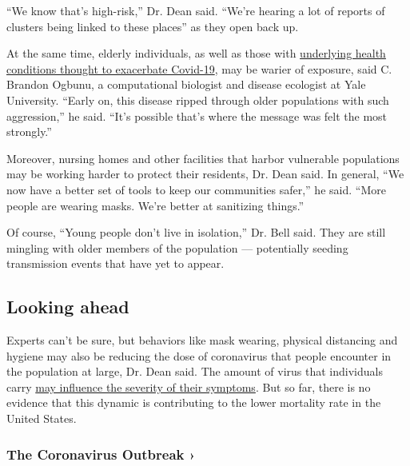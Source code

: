 ``We know that's high-risk,'' Dr. Dean said. ``We're hearing a lot of
reports of clusters being linked to these places'' as they open back up.

At the same time, elderly individuals, as well as those with
\href{https://www.nytimes.com/2020/06/15/health/coronavirus-underlying-conditions.html}{underlying
health conditions thought to exacerbate Covid-19}, may be warier of
exposure, said C. Brandon Ogbunu, a computational biologist and disease
ecologist at Yale University. ``Early on, this disease ripped through
older populations with such aggression,'' he said. ``It's possible
that's where the message was felt the most strongly.''

Moreover, nursing homes and other facilities that harbor vulnerable
populations may be working harder to protect their residents, Dr. Dean
said. In general, ``We now have a better set of tools to keep our
communities safer,'' he said. ``More people are wearing masks. We're
better at sanitizing things.''

Of course, ``Young people don't live in isolation,'' Dr. Bell said. They
are still mingling with older members of the population --- potentially
seeding transmission events that have yet to appear.

\hypertarget{looking-ahead}{%
\subsection{Looking ahead}\label{looking-ahead}}

Experts can't be sure, but behaviors like mask wearing, physical
distancing and hygiene may also be reducing the dose of coronavirus that
people encounter in the population at large, Dr. Dean said. The amount
of virus that individuals carry
\href{https://www.nytimes.com/2020/05/29/health/coronavirus-transmission-dose.html}{may
influence the severity of their symptoms}. But so far, there is no
evidence that this dynamic is contributing to the lower mortality rate
in the United States.

\href{https://www.nytimes.com/news-event/coronavirus?action=click\&pgtype=Article\&state=default\&region=MAIN_CONTENT_3\&context=storylines_faq}{}

\hypertarget{the-coronavirus-outbreak-}{%
\subsubsection{The Coronavirus Outbreak
›}\label{the-coronavirus-outbreak-}}

